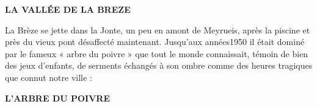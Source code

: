 
\begin{center}
    {\Large\bfseries LA VALLÉE DE LA BREZE}
\end{center}

\vspace{0.55cm}

La Brèze se jette dans la Jonte, un peu en amont de Meyrueis, après la piscine et près du
vieux pont désaffecté maintenant. Jusqu’aux années1950 il était dominé par le fameux « arbre
du poivre » que tout le monde connaissait, témoin de bien des jeux d’enfants, de serments
échangés à son ombre comme des heures tragiques que connut notre ville :

\vspace{0.65cm}

\begin{center}
    {\large\bfseries L’ARBRE DU POIVRE}
\end{center}

\vspace{0.45cm}

